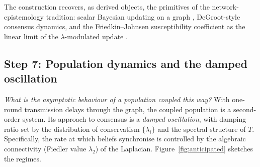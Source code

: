 The construction recovers, as derived objects, the primitives of the
network-epistemology tradition: scalar Bayesian updating on a graph
\citep{Bala1998_1}, DeGroot-style consensus dynamics, and the
Friedkin--Johnsen susceptibility coefficient as the linear limit of
the $\lambda$-modulated update \citep{Boudourides2026_7}.

\subsection{Step 7: Population dynamics and the damped oscillation}
\label{ssec:population}

\noindent\textit{What is the asymptotic behaviour of a population
coupled this way?} With one-round transmission delays through the
graph, the coupled population is a second-order system. Its approach
to consensus is a \emph{damped oscillation}, with damping ratio set
by the distribution of conservatism $\{\lambda_i\}$ and the spectral
structure of $T$. Specifically, the rate at which beliefs synchronise
is controlled by the algebraic connectivity (Fiedler value
$\lambda_2$) of the Laplacian. Figure~\ref{fig:anticipated} sketches
the regimes.

